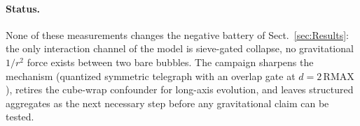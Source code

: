 \documentclass{ijuc}
\begin{document}
\paragraph{Status.} None of these measurements changes the negative battery
of Sect.~\ref{sec:Results}: the only interaction channel of the model is
sieve-gated collapse, no gravitational $1/r^2$ force exists between two bare
bubbles.
The campaign sharpens the mechanism (quantized symmetric telegraph with an
overlap gate at $d=2\,\mathrm{RMAX}$), retires the cube-wrap confounder for
long-axis evolution, and leaves structured aggregates as the next necessary
step before any gravitational claim can be tested.
\end{document}
